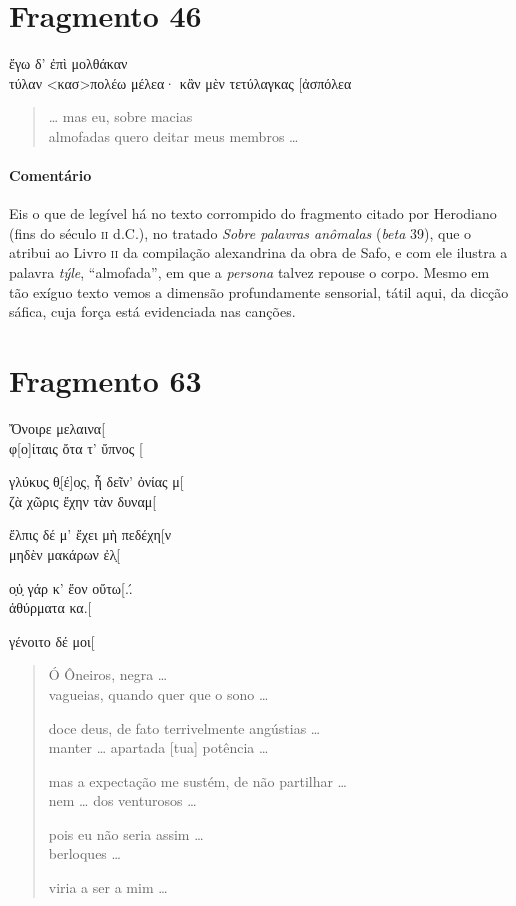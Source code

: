 \section{Fragmento 46}

\begin{gkverse}
ἔγω δ’ ἐπὶ μολθάκαν\\
τύλαν <κασ>πολέω \dagger{}μέλεα· κἂν μὲν τετύλαγκας [ἀσπόλεα\dagger{}
\end{gkverse}

\begin{verse}
\ldots{} mas eu, sobre macias\\
almofadas quero deitar meus membros \ldots{}
\end{verse}

\medskip

{\paragraph{Comentário} Eis o que de legível há no texto corrompido do fragmento citado por Herodiano (fins do século \textsc{ii} d.C.), no tratado \textit{Sobre palavras anômalas} (\textit{beta} 39), que o atribui ao Livro \textsc{ii} da compilação alexandrina da obra de Safo, e com ele ilustra a palavra \textit{týle}, ``almofada'', em que a \textit{persona} talvez repouse o corpo. Mesmo em tão exíguo texto vemos a dimensão profundamente sensorial, tátil aqui, da dicção sáfica, cuja força está evidenciada nas canções.}



\pagebreak
\section{Fragmento 63}

\begin{gkverse}
Ὄνοιρε μελαινα[\\
φ[ο]ίταις ὄτα τ’ ὔπνος [

γλύκυς̣ θ̣[έ]ο̣ς, ἦ δεῖν’ ὀνίας μ[\\
ζὰ χῶρις ἔχην τὰν δυναμ[

ἔλπις δέ μ’ ἔχει μὴ πεδέχη[ν\\
μηδὲν μακάρων ἐλ̣[

ο̣ὐ̣ γάρ κ’ ἔον οὔτω[..́   \\
ἀθύρματα κα.[

γένοιτο δέ μοι[
\end{gkverse}

\begin{verse}
Ó Ôneiros, negra \ldots{}\\
vagueias, quando quer que o sono \ldots{}

doce deus, de fato terrivelmente angústias \ldots{}\\
manter \ldots{} apartada [tua] potência \ldots{}

mas a expectação me sustém, de não partilhar \ldots{}\\
nem \ldots{}  dos venturosos \ldots{}

pois eu não seria assim \ldots{}\\
berloques \ldots{}

viria a ser a mim \ldots{}
\end{verse}

